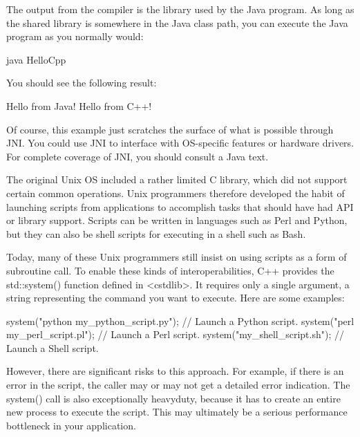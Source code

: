 The output from the compiler is the library used by the Java program. As long as the shared library is somewhere in the Java class path, you can execute the Java program as you normally would:

\begin{shell}
java HelloCpp
\end{shell}

You should see the following result:

\begin{shell}
Hello from Java!
Hello from C++!
\end{shell}

Of course, this example just scratches the surface of what is possible through JNI. You could use JNI to interface with OS-specific features or hardware drivers. For complete coverage of JNI, you should consult a Java text.


The original Unix OS included a rather limited C library, which did not support certain common operations. Unix programmers therefore developed the habit of launching scripts from applications to accomplish tasks that should have had API or library support. Scripts can be written in languages such as Perl and Python, but they can also be shell scripts for executing in a shell such as Bash.

Today, many of these Unix programmers still insist on using scripts as a form of subroutine call. To enable these kinds of interoperabilities, C++ provides the std::system() function defined in <cstdlib>. It requires only a single argument, a string representing the command you want to execute. Here are some examples:

\begin{cpp}
system("python my_python_script.py"); // Launch a Python script.
system("perl my_perl_script.pl"); // Launch a Perl script.
system("my_shell_script.sh"); // Launch a Shell script.
\end{cpp}

However, there are significant risks to this approach. For example, if there is an error in the script, the caller may or may not get a detailed error indication. The system() call is also exceptionally heavyduty, because it has to create an entire new process to execute the script. This may ultimately be a serious performance bottleneck in your application.

